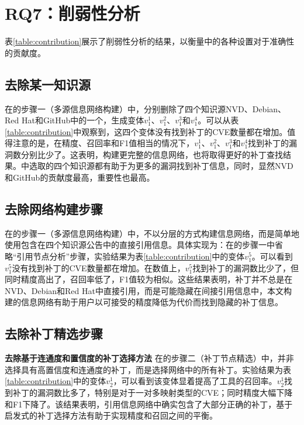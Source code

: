 \section{RQ7：削弱性分析}\label{sec:ablation}

表\ref{table:contribution}展示了削弱性分析的结果，以衡量\tool 中的各种设置对于准确性的贡献度。

\subsection{去除某一知识源} 
在\tool 的步骤一（多源信息网络构建）中，分别删除了四个知识源NVD、Debian、Red Hat和GitHub中的一个，生成变体$v_1^1$、$v_1^2$、$v_1^3$和$v_1^4$。可以从表\ref{table:contribution}中观察到，这四个变体没有找到补丁的CVE数量都在增加。值得注意的是，在精度、召回率和F1值相当的情况下，$v_1^1$、$v_1^2$、$v_1^3$和$v_1^4$找到补丁的漏洞数分别比\tool 少了。这表明，构建更完整的信息网络，也将取得更好的补丁查找结果。\tool 中选取的四个知识源都有助于为更多的漏洞找到补丁信息，同时，显然NVD和GitHub的贡献度最高，重要性也最高。

\subsection{去除网络构建步骤}
在\tool 的步骤一（多源信息网络构建）中，不以分层的方式构建信息网络，而是简单地使用包含在四个知识源公告中的直接引用信息。具体实现为：在\tool 的步骤一中省略“引用节点分析”步骤，实验结果为表\ref{table:contribution}中的变体$v_1^5$。可以看到$v_1^5$没有找到补丁的CVE数量都在增加。在数值上，$v_1^5$找到补丁的漏洞数比\tool 少了，但同时精度高出了，召回率低了，F1值较为相似。这些结果表明，补丁并不总是在NVD、Debian和Red Hat中直接引用，而是可能隐藏在间接引用信息中，本文构建的信息网络有助于用户以可接受的精度降低为代价而找到隐藏的补丁信息。

\subsection{去除补丁精选步骤}
\textbf{去除基于连通度和置信度的补丁选择方法}
在\tool 的步骤二（补丁节点精选）中，并非选择具有高置信度和连通度的补丁，而是选择网络中的所有补丁。实验结果为表\ref{table:contribution}中的变体$v_2^1$，可以看到该变体显着提高了工具的召回率。$v_2^1$找到补丁的漏洞数比\tool 多了，特别是对于一对多映射类型的CVE；同时精度大幅下降和F1下降了。该结果表明，引用信息网络中确实包含了大部分正确的补丁，基于启发式的补丁选择方法有助于实现精度和召回之间的平衡。

